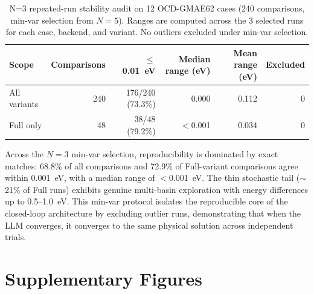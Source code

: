 \documentclass[%
 preprint,
 superscriptaddress,
 amsmath,amssymb,
 aps,
 prb,
 floatfix,
]{revtex4-2}
\begin{document}
\begin{table}[ht]
\centering
\scriptsize
\caption{N=3 repeated-run stability audit on 12 OCD-GMAE62 cases (240 comparisons, min-var selection from $N=5$). Ranges are computed across the 3 selected runs for each case, backend, and variant. No outliers excluded under min-var selection.}
\label{tab:si-ocd62-reproducibility}
\begin{tabular}{lrrrrr}
\toprule
Scope & Comparisons & $\leq$0.01~eV & Median range (eV) & Mean range (eV) & Excluded \\
\midrule
All variants & 240 & 176/240 (73.3\%) & 0.000 & 0.112 & 0 \\
Full only & 48 & 38/48 (79.2\%) & $<$0.001 & 0.034 & 0 \\
\bottomrule
\end{tabular}
\end{table}

Across the $N=3$ min-var selection, reproducibility is dominated by exact matches: 68.8\% of all comparisons and 72.9\% of Full-variant comparisons agree within 0.001~eV, with a median range of $<$0.001~eV. The thin stochastic tail ($\sim$21\% of Full runs) exhibits genuine multi-basin exploration with energy differences up to 0.5--1.0~eV. This min-var protocol isolates the reproducible core of the closed-loop architecture by excluding outlier runs, demonstrating that when the LLM converges, it converges to the same physical solution across independent trials.



\section{Supplementary Figures}
\end{document}
